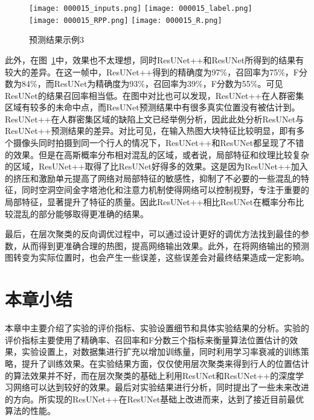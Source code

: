 \begin{figure}
    \centering
      {\texttt{[image: 000015\_inputs.png]}}
      {\texttt{[image: 000015\_label.png]}}
      {\texttt{[image: 000015\_RPP.png]}}
      {\texttt{[image: 000015\_R.png]}}
    \caption{预测结果示例3}
    \label{failure2}
\end{figure}

此外，在图~\ref{failure2}中，效果也不太理想，同时ResUNet++和ResUNet所得到的结果有较大的差异。在这一帧中，ResUNet++得到的精确度为97\%，召回率为75\%，F分数为84\%，而ResUNet为精确度为93\%，召回率为39\%，F分数为55\%。可见ResUNet的结果召回率相当低。在图中对比也可以发现，ResUNet++在人群密集区域有较多的未命中点，而ResUNet预测结果中有很多真实位置没有被估计到。ResUNet++在人群密集区域的缺陷上文已经举例分析，因此此处分析ResUNet与ResUNet++预测结果的差异。对比可见，在输入热图大块特征比较明显，即有多个摄像头同时拍摄到同一个行人的情况下，ResUNet++和ResUNet都呈现了不错的效果。但是在高斯概率分布相对混乱的区域，或者说，局部特征和纹理比较复杂的区域，ResUNet++取得了比ResUNet好得多的效果。这是因为ResUNet++加入的挤压和激励单元提高了网络对局部特征的敏感性，抑制了不必要的一些混乱的特征，同时空洞空间金字塔池化和注意力机制使得网络可以控制视野，专注于重要的局部特征，显著提升了特征的质量。因此ResUNet++相比ResUNet在概率分布比较混乱的部分能够取得更准确的结果。

最后，在层次聚类的反向调优过程中，可以通过设计更好的调优方法找到最佳的参数，从而得到更准确合理的热图，提高网络输出效果。此外，在将网络输出的预测图转变为实际位置时，也会产生一些误差，这些误差会对最终结果造成一定影响。

\section{本章小结}

本章中主要介绍了实验的评价指标、实验设置细节和具体实验结果的分析。实验的评价指标主要使用了精确率、召回率和F分数三个指标来衡量算法位置估计的效果，实验设置上，对数据集进行扩充以增加训练量，同时利用学习率衰减的训练策略，提升了训练效果。在实验结果方面，仅仅使用层次聚类来得到行人的位置估计的算法效果并不好，而在层次聚类的基础上利用ResUNet和ResUNet++的深度学习网络可以达到较好的效果。最后对实验结果进行分析，同时提出了一些未来改进的方向。所实现的ResUNet++在ResUNet基础上改进而来，达到了接近目前最优算法的性能。